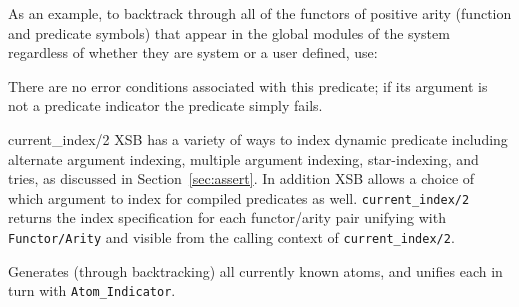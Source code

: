 \begin{description}
As an example, to backtrack through all of the functors of positive
arity (function and predicate symbols) that appear in the global
modules of the system regardless of whether they are system or a user
defined, use:


    There are no error conditions associated with this predicate; if its 
    argument is not a predicate indicator the predicate simply fails.

{current\_index/2}
%
XSB has a variety of ways to index dynamic predicate including
alternate argument indexing, multiple argument indexing,
star-indexing, and tries, as discussed in Section~\ref{sec:assert}.
In addition XSB allows a choice of which argument to index for
compiled predicates as well.  {\tt current\_index/2} returns the index
specification for each functor/arity pair unifying with {\tt
Functor/Arity} and visible from the calling context of  {\tt current\_index/2}.

    Generates (through backtracking) all currently known atoms, and unifies
    each in turn with {\tt Atom\_Indicator}. 


\end{description}
